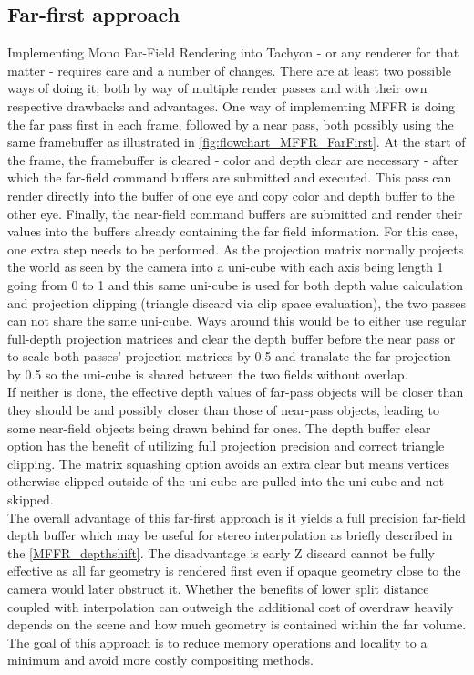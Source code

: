 \subsection{Far-first approach}
Implementing Mono Far-Field Rendering into \gls{Tachyon} - or any renderer for that matter - requires care and a number of changes. There are at least two possible ways of doing it, both by way of multiple render passes and with their own respective drawbacks and advantages. One way of implementing \gls{MFFR} is doing the far pass first in each frame, followed by a near pass, both possibly using the same framebuffer as illustrated in \autoref{fig:flowchart_MFFR_FarFirst}. At the start of the frame, the framebuffer is cleared - color and depth clear are necessary - after which the far-field command buffers are submitted and executed. This pass can render directly into the buffer of one eye and copy color and depth buffer to the other eye. Finally, the near-field command buffers are submitted and render their values into the buffers already containing the far field information. For this case, one extra step needs to be performed. As the projection matrix normally projects the world as seen by the camera into a uni-cube with each axis being length 1 going from 0 to 1 and this same uni-cube is used for both depth value calculation and projection clipping (triangle discard via clip space evaluation), the two passes can not share the same uni-cube. Ways around this would be to either use regular full-depth projection matrices and clear the depth buffer before the near pass or to scale both passes' projection matrices by 0.5 and translate the far projection by 0.5 so the uni-cube is shared between the two fields without overlap. \\
If neither is done, the effective depth values of far-pass objects will be closer than they should be and possibly closer than those of near-pass objects, leading to some near-field objects being drawn behind far ones. 
The depth buffer clear option has the benefit of utilizing full projection precision and correct triangle clipping. The matrix squashing option avoids an extra clear but means vertices otherwise clipped outside of the uni-cube are pulled into the uni-cube and not skipped. \\
The overall advantage of this far-first approach is it yields a full precision far-field depth buffer which may be useful for stereo interpolation as briefly described in the \autoref{MFFR_depthshift}. The disadvantage is early Z discard cannot be fully effective as all far geometry is rendered first even if opaque geometry close to the camera would later obstruct it. Whether the benefits of lower split distance coupled with interpolation can outweigh the additional cost of overdraw heavily depends on the scene and how much geometry is contained within the far volume. 
The goal of this approach is to reduce memory operations and locality to a minimum and avoid more costly compositing methods. 

